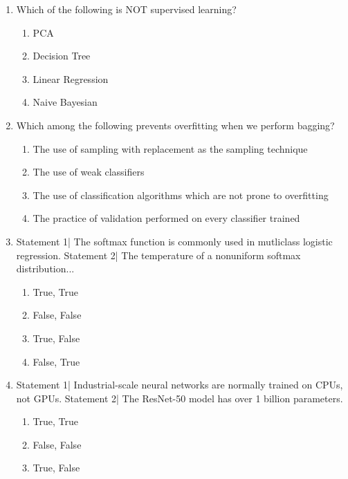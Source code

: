 \documentclass[12pt]{article}
\begin{document}
\begin{enumerate}[label=\arabic*.]
\begin{enumerate}[label=(\alph*)]
    \item they are biased
    \item they have high variance
    \item they are not consistent estimators
    \item None of the above
\end{enumerate}
\item Which of the following is NOT supervised learning?
\begin{enumerate}[label=(\alph*)]
    \item PCA
    \item Decision Tree
    \item Linear Regression
    \item Naive Bayesian
\end{enumerate}
\item Which among the following prevents overfitting when we perform bagging?
\begin{enumerate}[label=(\alph*)]
    \item The use of sampling with replacement as the sampling technique
    \item The use of weak classifiers
    \item The use of classification algorithms which are not prone to overfitting
    \item The practice of validation performed on every classifier trained
\end{enumerate}
\item Statement 1| The softmax function is commonly used in mutliclass logistic regression. Statement 2| The temperature of a nonuniform softmax distribution...
\begin{enumerate}[label=(\alph*)]
    \item True, True
    \item False, False
    \item True, False
    \item False, True
\end{enumerate}
\item Statement 1| Industrial-scale neural networks are normally trained on CPUs, not GPUs. Statement 2| The ResNet-50 model has over 1 billion parameters.
\begin{enumerate}[label=(\alph*)]
    \item True, True
    \item False, False
    \item True, False

\end{enumerate}
\end{enumerate}
\end{document}
